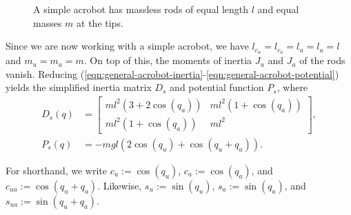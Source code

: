 \begin{figure}
    \centering
    
    \caption{A simple acrobot has massless rods of equal length \(l\) and 
    equal masses \(m\) at the tips.}
    \label{fig:simple-acrobot-model}
\end{figure}

Since we are now working with a simple acrobot, 
we have \(l_{c_u} = l_{c_a} = l_u = l_a = l\) and
\(m_u = m_a = m\). 
On top of this, the moments of inertia \(J_u\) and \(J_a\) of the rods vanish.
Reducing
(\ref{eqn:general-acrobot-inertia}-\ref{eqn:general-acrobot-potential})
yields the simplified inertia matrix \(D_s\) and potential function \(P_s\),
where
\begin{align}
    D_s(q) &= \begin{bmatrix}
        ml^2\left(3+2\cos(q_a)\right) & 
        ml^2\left(1+\cos(q_a)\right) \\
        ml^2\left(1+\cos(q_a)\right) &
        ml^2
    \end{bmatrix} 
    , \\
    P_s(q) &= -mgl\left(2\cos(q_u)+\cos(q_u+q_a)\right)
    .
\end{align}
\begin{notation}
    For shorthand, we write \(c_u := \cos(q_u)\), \(c_a := \cos(q_a)\), and 
    \(c_{ua} := \cos(q_u + q_a)\). Likewise, \(s_u := \sin(q_u)\), 
    \(s_a := \sin(q_a)\), and \(s_{ua} := \sin(q_u + q_a)\).
\end{notation}


